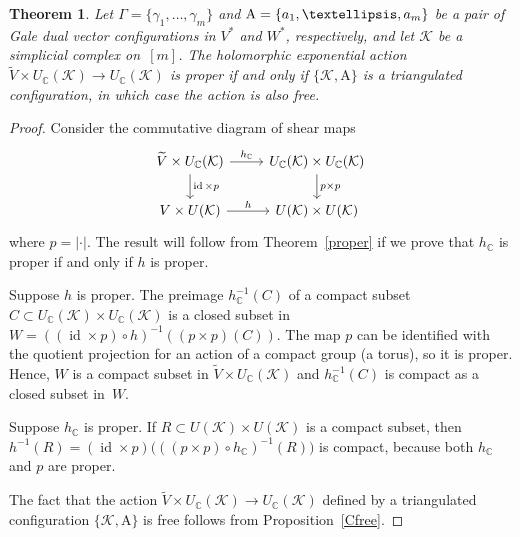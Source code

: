 \documentclass[a4paper]{amsart}
\newtheorem{theorem}{Theorem}[section]
\theoremstyle{definition}
\theoremstyle{remark}
\numberwithin{equation}{section}
\def\C{\mathbb C}
\def\sK{\mathcal K}
\newcommand{\mb}[1]{{\textbf {\textit#1}}}
\newcommand{\<}{\langle}
\renewcommand{\>}{\rangle}
\begin{document}
\begin{theorem}\label{hproper}
Let $\Gamma=\{\gamma_1,\ldots,\gamma_m\}$ and $\mathrm A=\{\mb a_1,\ldots,\mb a_m\}$ be a pair of Gale dual vector configurations in $V^*$ and $W^*$, respectively, and let $\sK$ be a simplicial complex on~$[m]$. The holomorphic exponential action $\widetilde V\times U_\C(\sK)\to U_\C(\sK)$ is proper if and only if $\{\sK,\mathrm A\}$ is a triangulated configuration, in which case the action is also free.
\end{theorem}
\begin{proof}
Consider the commutative diagram of shear maps
\[
\begin{tikzcd}
  \widetilde V\times U_\C(\sK) \ar{r}{h_\C} 
  \ar{d}{\mathop\mathrm{id}\times p} & 
  U_\C(\sK)\times U_\C(\sK) \ar{d}{p\times p}\\
  V\times U(\sK) \ar{r}{h} & U(\sK)\times U(\sK)
\end{tikzcd}
\]
where $p=|\cdot|$. The result will follow from Theorem~\ref{proper} if we prove that $h_\C$ is proper if and only if $h$ is proper.

Suppose $h$ is proper. The preimage $h_\C^{-1}(C)$ of a compact subset $C\subset U_\C(\sK)\times U_\C(\sK)$ is a closed subset in $W=((\mathop\mathrm{id}\times p)\circ h)^{-1}((p\times p)(C))$. The map $p$ can be identified with the quotient projection for an action of a compact group (a torus), so it is proper. Hence, $W$ is a compact subset in $\widetilde V\times U_\C(\sK)$ and  $h_\C^{-1}(C)$ is compact as a closed subset in~$W$.

Suppose $h_\C$ is proper. If $R\subset U(\sK)\times U(\sK)$ is a compact subset, then $h^{-1}(R)=(\mathop\mathrm{id}\times p)
\bigl(((p\times p)\circ h_\C)^{-1}(R)\bigr)$ is compact, because both $h_\C$ and $p$ are proper.

The fact that the action $\widetilde V\times U_\C(\sK)\to U_\C(\sK)$ defined by a triangulated configuration $\{\sK,\mathrm A\}$ is free follows from Proposition~\ref{Cfree}.
\end{proof}
\end{document}
